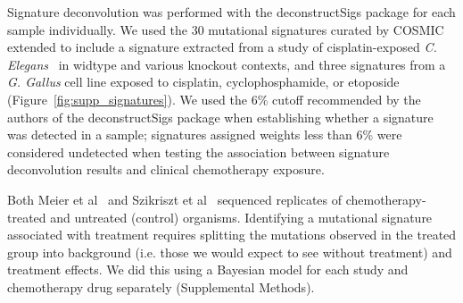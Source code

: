 Signature deconvolution was performed with the deconstructSigs\cite{Rosenthal_2016} package for each sample individually. We used the 30 mutational signatures curated by COSMIC~\cite{364242} extended to include a signature extracted from a study of cisplatin-exposed \textit{C. Elegans}~\cite{Meier_2014} in widtype and various knockout contexts, and three signatures from a \textit{G. Gallus} cell line exposed to cisplatin, cyclophosphamide, or etoposide~\cite{Szikriszt_2016} (Figure~\ref{fig:supp_signatures}). We used the 6\% cutoff recommended by the authors of the deconstructSigs package when establishing whether a signature was detected in a sample; signatures assigned weights less than 6\% were considered undetected when testing the association between signature deconvolution results and clinical chemotherapy exposure.

Both Meier et al~\cite{Meier_2014} and Szikriszt et al~\cite{Szikriszt_2016} sequenced replicates of chemotherapy-treated and untreated (control) organisms. Identifying a mutational signature associated with treatment requires splitting the mutations observed in the treated group into background (i.e. those we would expect to see without treatment) and treatment effects. We did this using a Bayesian model for each study and chemotherapy drug separately (Supplemental Methods).
